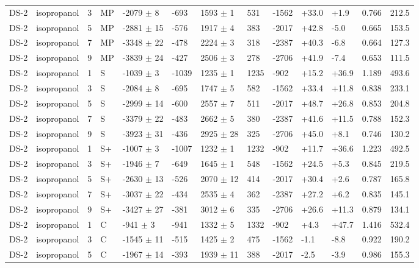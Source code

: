 \documentclass[11pt,a4paper]{article}
\begin{document}
\begin{landscape}
{\begin{longtable}{@{}lllllllllllll@{}}
DS-2 & isopropanol & 3 & MP & -2079 $\pm$ 8 & -693 & 1593 $\pm$ 1 & 531 & -1562 & +33.0 & +1.9 & 0.766 & 212.5 \\
DS-2 & isopropanol & 5 & MP & -2881 $\pm$ 15 & -576 & 1917 $\pm$ 4 & 383 & -2017 & +42.8 & -5.0 & 0.665 & 153.5 \\
DS-2 & isopropanol & 7 & MP & -3348 $\pm$ 22 & -478 & 2224 $\pm$ 3 & 318 & -2387 & +40.3 & -6.8 & 0.664 & 127.3 \\
DS-2 & isopropanol & 9 & MP & -3839 $\pm$ 24 & -427 & 2506 $\pm$ 3 & 278 & -2706 & +41.9 & -7.4 & 0.653 & 111.5 \\
DS-2 & isopropanol & 1 & S & -1039 $\pm$ 3 & -1039 & 1235 $\pm$ 1 & 1235 & -902 & +15.2 & +36.9 & 1.189 & 493.6 \\
DS-2 & isopropanol & 3 & S & -2084 $\pm$ 8 & -695 & 1747 $\pm$ 5 & 582 & -1562 & +33.4 & +11.8 & 0.838 & 233.1 \\
DS-2 & isopropanol & 5 & S & -2999 $\pm$ 14 & -600 & 2557 $\pm$ 7 & 511 & -2017 & +48.7 & +26.8 & 0.853 & 204.8 \\
DS-2 & isopropanol & 7 & S & -3379 $\pm$ 22 & -483 & 2662 $\pm$ 5 & 380 & -2387 & +41.6 & +11.5 & 0.788 & 152.3 \\
DS-2 & isopropanol & 9 & S & -3923 $\pm$ 31 & -436 & 2925 $\pm$ 28 & 325 & -2706 & +45.0 & +8.1 & 0.746 & 130.2 \\
DS-2 & isopropanol & 1 & S+ & -1007 $\pm$ 3 & -1007 & 1232 $\pm$ 1 & 1232 & -902 & +11.7 & +36.6 & 1.223 & 492.5 \\
DS-2 & isopropanol & 3 & S+ & -1946 $\pm$ 7 & -649 & 1645 $\pm$ 1 & 548 & -1562 & +24.5 & +5.3 & 0.845 & 219.5 \\
DS-2 & isopropanol & 5 & S+ & -2630 $\pm$ 13 & -526 & 2070 $\pm$ 12 & 414 & -2017 & +30.4 & +2.6 & 0.787 & 165.8 \\
DS-2 & isopropanol & 7 & S+ & -3037 $\pm$ 22 & -434 & 2535 $\pm$ 4 & 362 & -2387 & +27.2 & +6.2 & 0.835 & 145.1 \\
DS-2 & isopropanol & 9 & S+ & -3427 $\pm$ 27 & -381 & 3012 $\pm$ 6 & 335 & -2706 & +26.6 & +11.3 & 0.879 & 134.1 \\
DS-2 & isopropanol & 1 & C & -941 $\pm$ 3 & -941 & 1332 $\pm$ 5 & 1332 & -902 & +4.3 & +47.7 & 1.416 & 532.4 \\
DS-2 & isopropanol & 3 & C & -1545 $\pm$ 11 & -515 & 1425 $\pm$ 2 & 475 & -1562 & -1.1 & -8.8 & 0.922 & 190.2 \\
DS-2 & isopropanol & 5 & C & -1967 $\pm$ 14 & -393 & 1939 $\pm$ 11 & 388 & -2017 & -2.5 & -3.9 & 0.986 & 155.3 \\

\end{longtable}}
\end{landscape}
\end{document}

